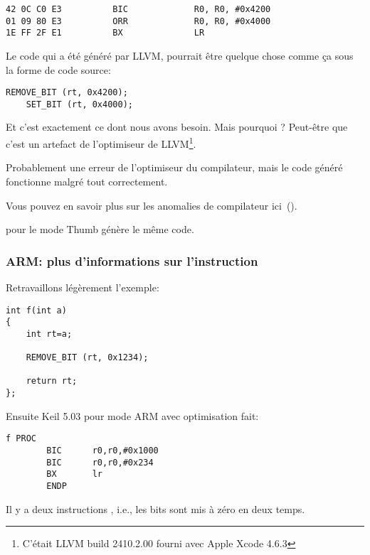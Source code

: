 \begin{lstlisting}[caption=\OptimizingXcodeIV (\ARMMode),label=ARM_leaf_example3,style=customasmARM]
42 0C C0 E3          BIC             R0, R0, #0x4200
01 09 80 E3          ORR             R0, R0, #0x4000
1E FF 2F E1          BX              LR
\end{lstlisting}

Le code qui a été généré par LLVM, pourrait être quelque chose  comme ça sous la
forme de code source:

\begin{lstlisting}[style=customc]
    REMOVE_BIT (rt, 0x4200);
    SET_BIT (rt, 0x4000);
\end{lstlisting}

Et c'est exactement ce dont nous avons besoin.
Mais pourquoi ?
Peut-être que c'est un artefact de l'optimiseur de LLVM\footnote{C'était LLVM build
2410.2.00 fourni avec Apple Xcode 4.6.3}.

Probablement une erreur de l'optimiseur du compilateur, mais le code généré fonctionne
malgré tout correctement.

Vous pouvez en savoir plus sur les anomalies de compilateur ici~().

\OptimizingXcodeIV pour le mode Thumb génère le même code.

\subsubsection{ARM: plus d'informations sur l'instruction }

Retravaillons légèrement l'exemple:

\begin{lstlisting}[style=customc]
int f(int a)
{
    int rt=a;

    REMOVE_BIT (rt, 0x1234);

    return rt;
};
\end{lstlisting}

Ensuite Keil 5.03 pour mode ARM avec optimisation fait:

\begin{lstlisting}[style=customasmARM]
f PROC
        BIC      r0,r0,#0x1000
        BIC      r0,r0,#0x234
        BX       lr
        ENDP
\end{lstlisting}

Il y a deux instructions , i.e., les bits  sont mis à zéro en
deux temps.

